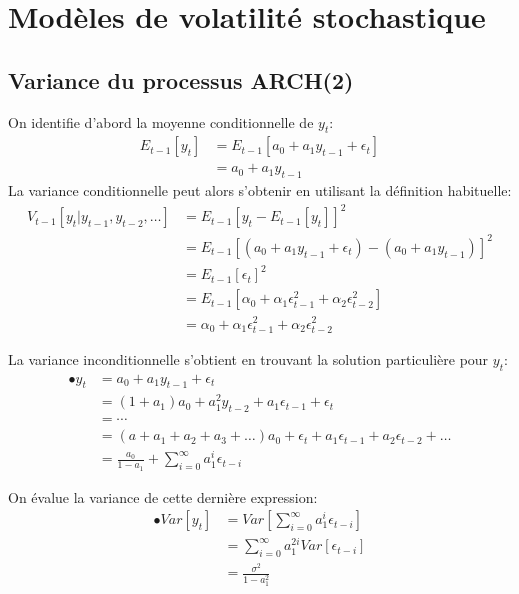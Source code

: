 \documentclass{article}
\begin{document}

\addtocounter{section}{2}
\section{Modèles de volatilité stochastique}

\subsection{Variance du processus ARCH(2)}

On identifie d'abord la moyenne conditionnelle de $y_t$:
\begin{align}
E_{t-1}[y_t] &= E_{t-1}[a_0 + a_1 y_{t-1} + \epsilon_t] \\
&= a_0 + a_1 y_{t-1}
\end{align}
La variance conditionnelle peut alors s'obtenir en utilisant la définition habituelle:
\begin{align*}
V_{t-1}[y_t | y_{t-1}, y_{t-2}, \ldots] &= E_{t-1}[y_t - E_{t-1}[y_t]]^{2} \\
&= E_{t-1}[(a_0 + a_1 y_{t-1} + \epsilon_t)-(a_0 + a_1 y_{t-1})]^{2} \\
&= E_{t-1}[\epsilon_t]^{2} \\
&= E_{t-1}[\alpha_0 + \alpha_1\epsilon_{t-1}^2 + \alpha_2\epsilon_{t-2}^2] \\
&= \alpha_0 + \alpha_1\epsilon_{t-1}^2 + \alpha_2\epsilon_{t-2}^2
\end{align*}

La variance inconditionnelle s'obtient en trouvant la solution particulière pour $y_t$:
\begin{align*}
•y_t &= a_0 + a_1 y_{t-1} + \epsilon_t \\
&= (1+a_1)a_0 + a_1^2 y_{t-2} + a_1 \epsilon_{t-1} + \epsilon_t \\
&= \cdots \\
&= (a+a_1+a_2+a_3+\ldots)a_0 + \epsilon_t + a_1\epsilon_{t-1} + a_2\epsilon_{t-2} + \ldots \\
&= \frac{a_0}{1-a_1} + \sum_{i=0}^{\infty} a_1^{i}\epsilon_{t-i}
\end{align*}

On évalue la variance de cette dernière expression:
\begin{align*}
•Var[y_t] &= Var[\sum_{i=0}^{\infty} a_1^{i}\epsilon_{t-i}] \\
&= \sum_{i=0}^{\infty} a_1^{2i} Var[\epsilon_{t-i}] \\
&= \frac{\sigma^2}{1-a_1^2}
\end{align*}
\end{document}
